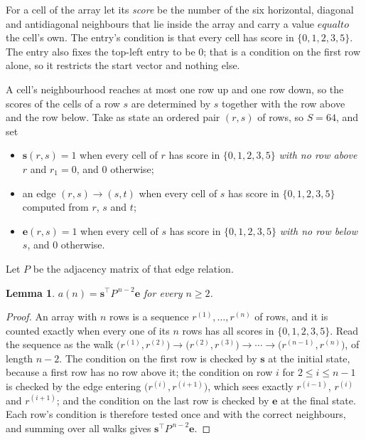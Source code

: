 \documentclass[11pt,a4paper]{article}
\theoremstyle{plain}
\newtheorem{lemma}[theorem]{Lemma}
\theoremstyle{definition}
\begin{document}
For a cell of the array let its \emph{score} be the number of the six horizontal, diagonal and antidiagonal neighbours that lie inside
the array and carry a value $equal to$ the cell's own. The entry's condition is that every cell
has score in $\{0,1,2,3,5\}$. The entry also fixes the top-left entry to be $0$; that is a condition on the first row alone, so it restricts the start vector and nothing else.

A cell's neighbourhood reaches at most one row up and one row down, so the scores of the
cells of a row $s$ are determined by $s$ together with the row above and the row below.
Take as state an ordered pair $(r,s)$ of rows, so $S=64$, and set
\begin{itemize}
\item $\mathbf{s}(r,s)=1$ when every cell of $r$ has score in $\{0,1,2,3,5\}$ \emph{with no row
above $r$} and $r_1=0$, and $0$ otherwise;
\item an edge $(r,s)\to(s,t)$ when every cell of $s$ has score in $\{0,1,2,3,5\}$ computed from
$r$, $s$ and $t$;
\item $\mathbf{e}(r,s)=1$ when every cell of $s$ has score in $\{0,1,2,3,5\}$ \emph{with no row
below $s$}, and $0$ otherwise.
\end{itemize}
Let $P$ be the adjacency matrix of that edge relation.

\begin{lemma}\label{lem:walk}
$a(n)=\mathbf{s}^{\!\top}P^{\,n-2}\mathbf{e}$ for every $n\ge2$.
\end{lemma}

\begin{proof}
An array with $n$ rows is a sequence $r^{(1)},\dots,r^{(n)}$ of rows, and it is counted
exactly when every one of its $n$ rows has all scores in $\{0,1,2,3,5\}$. Read the sequence as the
walk $\bigl(r^{(1)},r^{(2)}\bigr)\to\bigl(r^{(2)},r^{(3)}\bigr)\to\cdots\to
\bigl(r^{(n-1)},r^{(n)}\bigr)$, of length $n-2$. The condition on the first row is
checked by $\mathbf{s}$ at the initial state, because a first row has no row above it; the
condition on row $i$ for $2\le i\le n-1$ is checked by the edge entering
$\bigl(r^{(i)},r^{(i+1)}\bigr)$, which sees exactly $r^{(i-1)}$, $r^{(i)}$ and
$r^{(i+1)}$; and the condition on the last row is checked by $\mathbf{e}$ at the final
state. Each row's condition is therefore tested once and with the correct neighbours, and
summing over all walks gives $\mathbf{s}^{\!\top}P^{\,n-2}\mathbf{e}$.
\end{proof}
\end{document}
